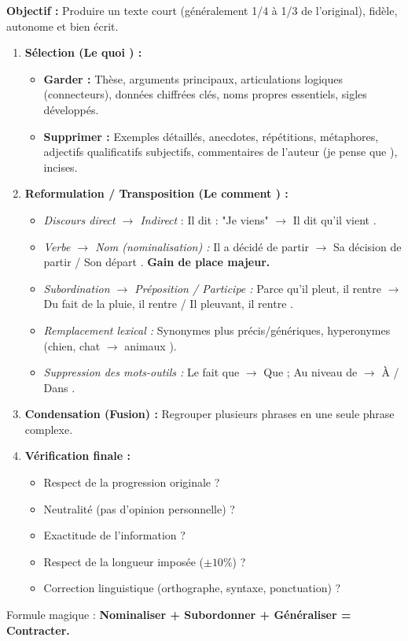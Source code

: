 \documentclass[11pt]{article}
\newcommand{\cle}[1]{{\popxbold\color{popdark}#1}}
\begin{document}
\begin{methode}
\textbf{Objectif :} Produire un texte court (généralement 1/4 à 1/3 de l'original), fidèle, autonome et bien écrit.
\begin{enumerate}
    \item \textbf{Sélection (Le \og quoi \fg{}) :} 
    \begin{itemize}
        \item \textbf{Garder :} Thèse, arguments principaux, articulations logiques (connecteurs), données chiffrées clés, noms propres essentiels, sigles développés.
        \item \textbf{Supprimer :} Exemples détaillés, anecdotes, répétitions, métaphores, adjectifs qualificatifs subjectifs, commentaires de l'auteur (\og je pense que \fg{}), incises.
    \end{itemize}
    \item \textbf{Reformulation / Transposition (Le \og comment \fg{}) :} 
    \begin{itemize}
        \item \emph{Discours direct $\rightarrow$ Indirect} : \og Il dit : "Je viens" \fg{} $\rightarrow$ \og Il dit qu'il vient \fg{}.
        \item \emph{Verbe $\rightarrow$ Nom (nominalisation) :} \og Il a décidé de partir \fg{} $\rightarrow$ \og Sa décision de partir \fg{} / \og Son départ \fg{}. \textbf{Gain de place majeur.}
        \item \emph{Subordination $\rightarrow$ Préposition / Participe :} \og Parce qu'il pleut, il rentre \fg{} $\rightarrow$ \og Du fait de la pluie, il rentre \fg{} / \og Il pleuvant, il rentre \fg{}.
        \item \emph{Remplacement lexical :} Synonymes plus précis/génériques, hyperonymes (\og chien, chat \fg{} $\rightarrow$ \og animaux \fg{}).
        \item \emph{Suppression des mots-outils :} \og Le fait que \fg{} $\rightarrow$ \og Que \fg{} ; \og Au niveau de \fg{} $\rightarrow$ \og À \fg{} / \og Dans \fg{}.
    \end{itemize}
    \item \textbf{Condensation (Fusion) :} Regrouper plusieurs phrases en une seule phrase complexe.
    \item \textbf{Vérification finale :} 
    \begin{itemize}
        \item Respect de la progression originale ?
        \item Neutralité (pas d'opinion personnelle) ?
        \item Exactitude de l'information ?
        \item Respect de la longueur imposée ($\pm 10\%$) ?
        \item Correction linguistique (orthographe, syntaxe, ponctuation) ?
    \end{itemize}
\end{enumerate}
\cle{Formule magique} : \textbf{Nominaliser + Subordonner + Généraliser = Contracter.}
\end{methode}
\end{document}
